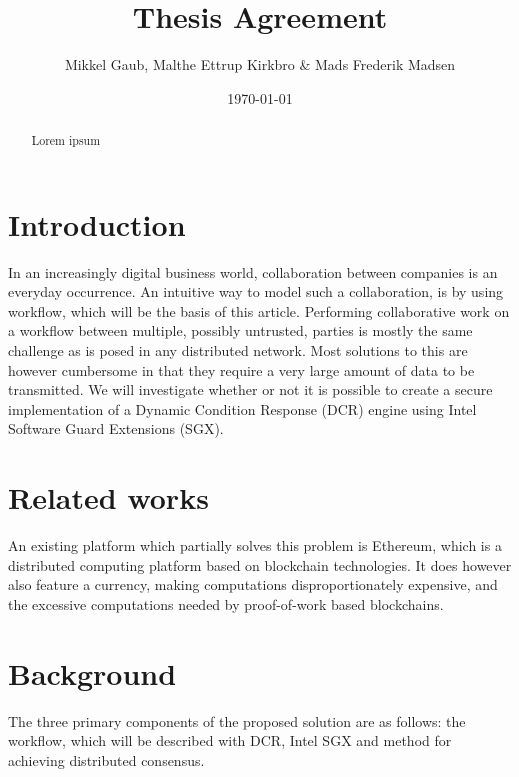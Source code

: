 \documentclass{article}
\author{Mikkel Gaub, Malthe Ettrup Kirkbro \& Mads Frederik Madsen}
\title{Thesis Agreement}
\date{\today}
\begin{document}
\maketitle
\thispagestyle{empty}

\vspace{\fill}

\begin{abstract}
Lorem ipsum
\end{abstract}

\pagebreak

\tableofcontents

\pagebreak

	\section{Introduction}

	In an increasingly digital business world, collaboration between companies is an everyday occurrence.
	An intuitive way to model such a collaboration, is by using workflow, which will be the basis of this article.
	Performing collaborative work on a workflow between multiple, possibly untrusted, parties is mostly the same challenge as is posed in any distributed network. 
	Most solutions to this are however cumbersome in that they require a very large amount of data to be transmitted.
	We will investigate whether or not it is possible to create a secure implementation of a Dynamic Condition Response\cite{dcr-paper} (DCR) engine using Intel Software Guard Extensions\cite{intel-sgx-explained} (SGX).

	\section{Related works}

	An existing platform which partially solves this problem is Ethereum\cite{ethereum-white-paper}, which is a distributed computing platform based on blockchain technologies.
	It does however also feature a currency, making computations disproportionately expensive, and the excessive computations needed by proof-of-work based blockchains.

	\section{Background}

	The three primary components of the proposed solution are as follows: the workflow, which will be described with DCR, Intel SGX and method for achieving distributed consensus.
\end{document}
